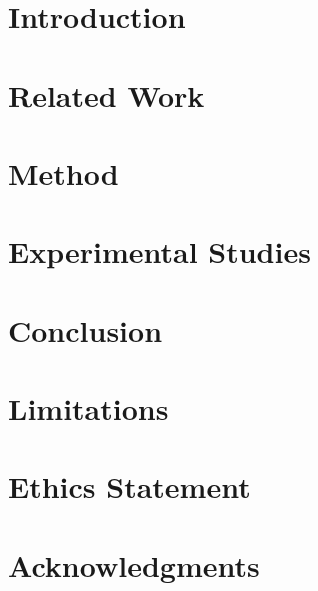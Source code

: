 \documentclass[11pt]{article}
\title{}
\author{
  Author One\textsuperscript{*} \quad Author Two\textsuperscript{*} \quad Author Three \\
  Institution Name \\
  \texttt{\{author1, author2, author3\}@institution.edu}
}
\numberwithin{equation}{section}
\begin{document}
\maketitle

\begin{abstract}

\end{abstract}

\section{Introduction}
\label{sec:intro}


\section{Related Work}
\label{sec:related}


\section{Method}
\label{sec:method}


\section{Experimental Studies}
\label{sec:exp}


\section{Conclusion}
\label{sec:conclusion}


\section*{Limitations}


\section*{Ethics Statement}


\section*{Acknowledgments}





\appendix

\end{document}
